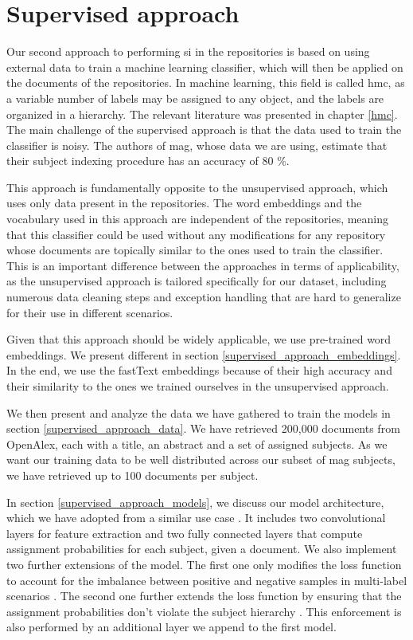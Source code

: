 \section{Supervised approach} \label{supervised_approach}

Our second approach to performing \acrshort{si} in the repositories is based on using external data to train a machine learning classifier, which will then be applied on the documents of the repositories. In machine learning, this field is called \acrfull{hmc}, as a variable number of labels may be assigned to any object, and the labels are organized in a hierarchy. The relevant literature was presented in chapter \ref{hmc}. The main challenge of the supervised approach is that the data used to train the classifier is noisy. The authors of \acrshort{mag}, whose data we are using, estimate that their subject indexing procedure has an accuracy of 80 \%.

This approach is fundamentally opposite to the unsupervised approach, which uses only data present in the repositories. The word embeddings and the vocabulary used in this approach are independent of the repositories, meaning that this classifier could be used without any modifications for any repository whose documents are topically similar to the ones used to train the classifier. This is an important difference between the approaches in terms of applicability, as the unsupervised approach is tailored specifically for our dataset, including numerous data cleaning steps and exception handling that are hard to generalize for their use in different scenarios.

Given that this approach should be widely applicable, we use pre-trained word embeddings. We present different in section \ref{supervised_approach_embeddings}. In the end, we use the fastText embeddings \cite{mikolov2017advances} because of their high accuracy and their similarity to the ones we trained ourselves in the unsupervised approach.

We then present and analyze the data we have gathered to train the models in section \ref{supervised_approach_data}. We have retrieved 200,000 documents from OpenAlex, each with a title, an abstract and a set of assigned subjects. As we want our training data to be well distributed across our subset of \acrshort{mag} subjects, we have retrieved up to 100 documents per subject.

In section \ref{supervised_approach_models}, we discuss our model architecture, which we have adopted from a similar use case \cite{gargiulo2019deep}. It includes two convolutional layers for feature extraction and two fully connected layers that compute assignment probabilities for each subject, given a document. We also implement two further extensions of the model. The first one only modifies the loss function to account for the imbalance between positive and negative samples in multi-label scenarios \cite{ben2020asymmetric}. The second one further extends the loss function by ensuring that the assignment probabilities don't violate the subject hierarchy \cite{giunchiglia2020coherent}. This enforcement is also performed by an additional layer we append to the first model.

